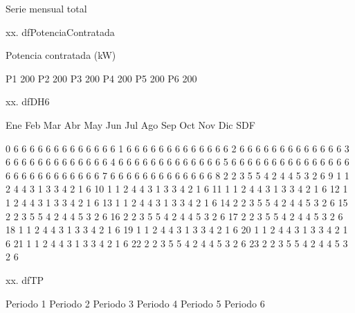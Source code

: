 \documentclass[a4paper,10pt,twocolumn]{article}
\begin{document}
\begin{Form}
\begin{table}[H]
{                        }
                        \caption{Serie mensual total}
                    \end{table}
                    

xx. dfPotenciaContratada

    Potencia contratada (kW)
                            
P1                       200
P2                       200
P3                       200
P4                       200
P5                       200
P6                       200

xx. dfDH6

    Ene  Feb  Mar  Abr  May  Jun  Jul  Ago  Sep  Oct  Nov  Dic  SDF
                                                                   
0     6    6    6    6    6    6    6    6    6    6    6    6    6
1     6    6    6    6    6    6    6    6    6    6    6    6    6
2     6    6    6    6    6    6    6    6    6    6    6    6    6
3     6    6    6    6    6    6    6    6    6    6    6    6    6
4     6    6    6    6    6    6    6    6    6    6    6    6    6
5     6    6    6    6    6    6    6    6    6    6    6    6    6
6     6    6    6    6    6    6    6    6    6    6    6    6    6
7     6    6    6    6    6    6    6    6    6    6    6    6    6
8     2    2    3    5    5    4    2    4    4    5    3    2    6
9     1    1    2    4    4    3    1    3    3    4    2    1    6
10    1    1    2    4    4    3    1    3    3    4    2    1    6
11    1    1    2    4    4    3    1    3    3    4    2    1    6
12    1    1    2    4    4    3    1    3    3    4    2    1    6
13    1    1    2    4    4    3    1    3    3    4    2    1    6
14    2    2    3    5    5    4    2    4    4    5    3    2    6
15    2    2    3    5    5    4    2    4    4    5    3    2    6
16    2    2    3    5    5    4    2    4    4    5    3    2    6
17    2    2    3    5    5    4    2    4    4    5    3    2    6
18    1    1    2    4    4    3    1    3    3    4    2    1    6
19    1    1    2    4    4    3    1    3    3    4    2    1    6
20    1    1    2    4    4    3    1    3    3    4    2    1    6
21    1    1    2    4    4    3    1    3    3    4    2    1    6
22    2    2    3    5    5    4    2    4    4    5    3    2    6
23    2    2    3    5    5    4    2    4    4    5    3    2    6

xx. dfTP

        Periodo 1  Periodo 2  Periodo 3  Periodo 4  Periodo 5 Periodo 6
                                                                       

\end{Form}
\end{document}
